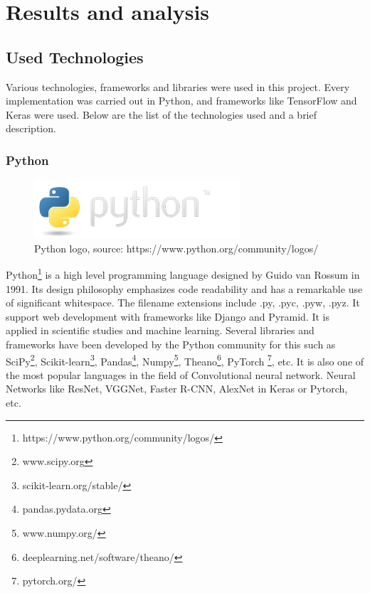 \chapter{Results and analysis}\label{ch:Results}


\section{Used Technologies}
Various technologies, frameworks and libraries were used in this project. Every implementation was carried out in Python, and frameworks like TensorFlow and Keras were used. Below are the list of the technologies used and a brief description.

\subsection{Python}

\begin{figure}
    \centering
    \includegraphics[width=0.7\linewidth]{images/python-logo.png}
     \caption{Python logo, source: https://www.python.org/community/logos/}
  \end{figure}

Python\footnote{https://www.python.org/community/logos/} is a high level programming language designed by Guido van Rossum in 1991. Its design philosophy emphasizes code readability and has a remarkable use of significant whitespace. The filename extensions include .py, .pyc, .pyw, .pyz. It support web development with frameworks like Django and Pyramid. It is applied in scientific studies and machine learning. Several libraries and frameworks have been developed by the Python community for this such as 
SciPy\footnote{www.scipy.org}, Scikit-learn\footnote{scikit-learn.org/stable/}, Pandas\footnote{pandas.pydata.org}, Numpy\footnote{www.numpy.org/}, Theano\footnote{deeplearning.net/software/theano/}, PyTorch \footnote{pytorch.org/}, etc. It is also one of the most popular languages in the field of Convolutional neural network. Neural Networks like ResNet, VGGNet, Faster R-CNN, AlexNet in Keras or Pytorch, etc. 


